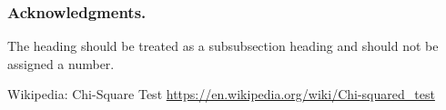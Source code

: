 \documentclass[runningheads,a4paper]{llncs}
\begin{document}
\subsubsection*{Acknowledgments.} The heading should be treated as a
subsubsection heading and should not be assigned a number.

\begin{thebibliography}{4}

 Wikipedia: Chi-Square Test  \url{https://en.wikipedia.org/wiki/Chi-squared\_test}

\end{thebibliography}
\end{document}
